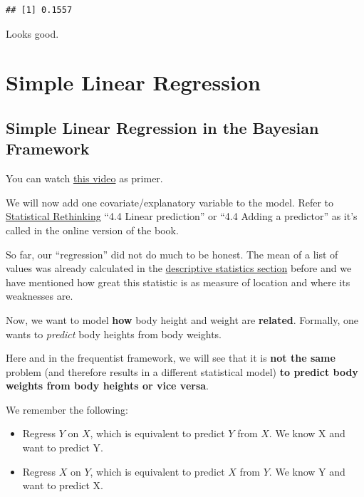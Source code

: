 \documentclass[
]{book}
\providecommand{\tightlist}{%
  \setlength{\itemsep}{0pt}\setlength{\parskip}{0pt}}
\begin{document}
\begin{verbatim}
## [1] 0.1557
\end{verbatim}

Looks good.

\chapter{Simple Linear Regression}\label{simple-linear-regression}

\section{Simple Linear Regression in the Bayesian Framework}\label{simple_lin_reg_bayes}

You can watch \href{https://www.youtube.com/watch?v=14mkCpJ7tKs&ab_channel=VeryNormal}{this video} as primer.

We will now add one covariate/explanatory variable to the model.
Refer to \href{https://civil.colorado.edu/~balajir/CVEN6833/bayes-resources/RM-StatRethink-Bayes.pdf}{Statistical Rethinking}
``4.4 Linear prediction'' or ``4.4 Adding a predictor'' as it's called in the online version of the book.

So far, our ``regression'' did not do much to be honest. The mean of a list of values
was already calculated in the \href{https://jdegenfellner.github.io/Script_QM1_ZHAW/descriptive_stats.html}{descriptive statistics section}
before and we have mentioned how great this statistic is as measure of location and where its weaknesses are.

Now, we want to model \textbf{how} body height and weight are \textbf{related}.
Formally, one wants to \emph{predict} body heights from body weights.

Here and in the frequentist framework, we will see that it is \textbf{not the same}
problem (and therefore results in a different statistical model)
\textbf{to predict body weights from body heights or vice versa}.

We remember the following:

\begin{itemize}
\tightlist
\item
  Regress \(Y\) on \(X\), which is equivalent to predict \(Y\) from \(X\).
  We know X and want to predict Y.
\item
  Regress \(X\) on \(Y\), which is equivalent to predict \(X\) from \(Y\).
  We know Y and want to predict X.
\end{itemize}
\end{document}
